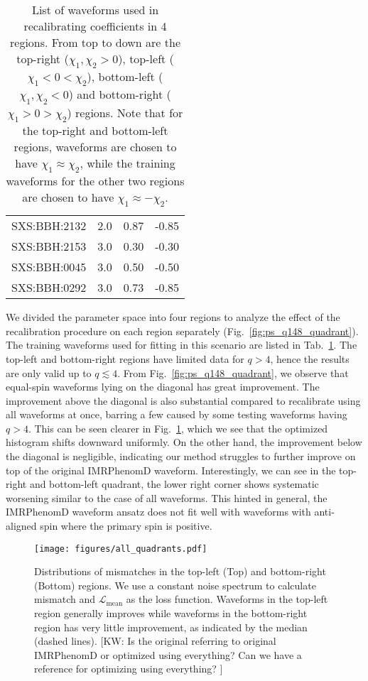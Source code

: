 \documentclass[twocolumn]{aastex631}
\newcommand{\kw}[1]{{\color{rb4}[KW: #1 ]}}
\begin{document}
\begin{table}[t]
\begin{tabularx}{0.8\columnwidth}{@{\extracolsep{\fill}}lrrr}
		SXS:BBH:2132 & 2.0 & 0.87     & -0.85    \\
		SXS:BBH:2153 & 3.0 & 0.30     & -0.30    \\
		SXS:BBH:0045 & 3.0 & 0.50     & -0.50    \\
		SXS:BBH:0292 & 3.0 & 0.73     & -0.85    \\ \midrule\bottomrule
	\end{tabularx}
	\caption{List of waveforms used in recalibrating coefficients in 4 regions. From top to down are the top-right ($\chi_1,\chi_2>0$), top-left ($\chi_1<0<\chi_2$), bottom-left ($\chi_1,\chi_2<0$) and bottom-right ($\chi_1>0>\chi_2$) regions. Note that for the top-right and bottom-left regions, waveforms are chosen to have $\chi_1\approx\chi_2$, while the training waveforms for the other two regions are chosen to have $\chi_1\approx-\chi_2$.}
	\label{tab:quadrants}
\end{table}

We divided the parameter space into four regions to analyze the effect of the
recalibration procedure on each region separately
(Fig.~\ref{fig:ps_q148_quadrant}). The training waveforms used for fitting in
this scenario are listed in Tab.~\ref{tab:quadrants}. The top-left and
bottom-right regions have limited data for $q>4$, hence the results are only
valid up to $q\lesssim4$. From Fig.~\ref{fig:ps_q148_quadrant}, we observe that
equal-spin waveforms lying on the diagonal has great improvement. The
improvement above the diagonal is also substantial compared to recalibrate using
all waveforms at once, barring a few caused by some testing waveforms having
$q>4$. This can be seen clearer in Fig.~\ref{fig:all_quadrants}, which we see
that the optimized histogram shifts downward uniformly. On the other hand, the
improvement below the diagonal is negligible, indicating our method struggles to
further improve on top of the original IMRPhenomD waveform. Interestingly, we
can see in the top-right and bottom-left quadrant, the lower right corner shows
systematic worsening similar to the case of all waveforms. This hinted in
general, the IMRPhenomD waveform ansatz does not fit well with waveforms with
anti-aligned spin where the primary spin is positive.

\begin{figure}[t]
	\centering
	\texttt{[image: figures/all\_quadrants.pdf]}
	\caption{Distributions of mismatches in the top-left (Top) and bottom-right
	(Bottom) regions. We use a constant noise spectrum to calculate mismatch and
	$\mathcal{L}_{\mathrm{mean}}$ as the loss function. Waveforms in the
	top-left region generally improves while waveforms in the bottom-right
	region has very little improvement, as indicated by the median (dashed
	lines). \kw{Is the original referring to original IMRPhenomD or optimized
	using everything? Can we have a reference for optimizing using everything?}}
	\label{fig:all_quadrants}
\end{figure}
\end{document}
